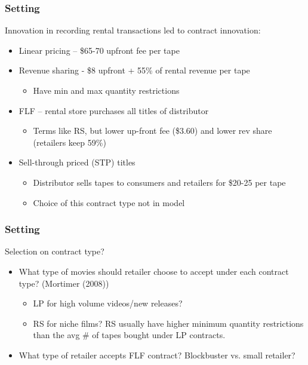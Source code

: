 \documentclass[notes=show]{beamer}
\begin{document}

\begin{frame}
\frametitle{Setting}

Innovation in recording rental transactions led to contract innovation:

\begin{itemize}
\item Linear pricing -- \$65-70 upfront fee per tape

\item Revenue sharing - \$8 upfront + 55\% of rental revenue per tape

\begin{itemize}
\item Have min and max quantity restrictions
\end{itemize}

\item FLF -- rental store purchases all titles of distributor

\begin{itemize}
\item Terms like RS, but lower up-front fee (\$3.60) and lower rev share
(retailers keep 59\%)
\end{itemize}

\item Sell-through priced (STP) titles

\begin{itemize}
\item Distributor sells tapes to consumers and retailers for \$20-25 per tape

\item Choice of this contract type not in model
\end{itemize}
\end{itemize}
\end{frame}



\begin{frame}
\frametitle{Setting}

Selection on contract type?

\begin{itemize}
\item What type of movies should retailer choose to accept under each
contract type? (Mortimer (2008))

\begin{itemize}
\item LP for high volume videos/new releases?

\item RS for niche films? RS usually have higher minimum quantity
restrictions than the avg \# of tapes bought under LP contracts.
\end{itemize}

\item What type of retailer accepts FLF contract? Blockbuster vs. small
retailer?
\end{itemize}
\end{frame}
\end{document}
